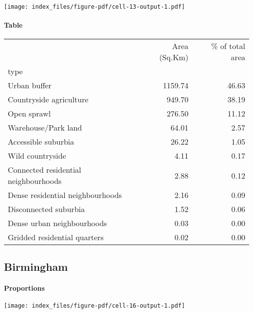 \documentclass[
  letterpaper,
  DIV=11,
  numbers=noendperiod,
  oneside]{scrartcl}
\let\oldparagraph\paragraph
\renewcommand{\paragraph}[1]{\oldparagraph{#1}\mbox{}}
\begin{document}
\texttt{[image: index\_files/figure-pdf/cell-13-output-1.pdf]}

\hypertarget{table-1}{%
\paragraph{Table}\label{table-1}}

\begin{tabular}{lrr}
\toprule
{} &  Area (Sq.Km) &  \% of total area \\
type                                 &               &                  \\
\midrule
Urban buffer                         &       1159.74 &            46.63 \\
Countryside agriculture              &        949.70 &            38.19 \\
Open sprawl                          &        276.50 &            11.12 \\
Warehouse/Park land                  &         64.01 &             2.57 \\
Accessible suburbia                  &         26.22 &             1.05 \\
Wild countryside                     &          4.11 &             0.17 \\
Connected residential neighbourhoods &          2.88 &             0.12 \\
Dense residential neighbourhoods     &          2.16 &             0.09 \\
Disconnected suburbia                &          1.52 &             0.06 \\
Dense urban neighbourhoods           &          0.03 &             0.00 \\
Gridded residential quarters         &          0.02 &             0.00 \\
\bottomrule
\end{tabular}

\hypertarget{birmingham}{%
\subsection{Birmingham}\label{birmingham}}

\hypertarget{proportions-2}{%
\paragraph{Proportions}\label{proportions-2}}

\texttt{[image: index\_files/figure-pdf/cell-16-output-1.pdf]}
\end{document}
